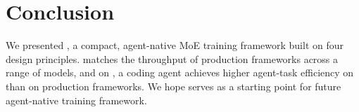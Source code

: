 \section{Conclusion}
\label{sec:conclusion}

We presented \sys, a compact, agent-native MoE training framework
built on four design principles.
\sys matches the throughput of production frameworks across a
range of models, and on \sysbench, a coding agent achieves higher
agent-task efficiency on \sys than on production frameworks.
We hope \sys serves as a starting point for future agent-native
training framework.

